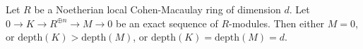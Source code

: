 \begin{lemma}
\label{lemma-dimension-shift}
Let $R$ be a Noetherian local Cohen-Macaulay ring of dimension $d$.
Let $0 \to K \to R^{\oplus n} \to M \to 0$ be an exact sequence of
$R$-modules. Then either $M = 0$, or $\text{depth}(K) > \text{depth}(M)$, or
$\text{depth}(K) = \text{depth}(M) = d$.
\end{lemma}